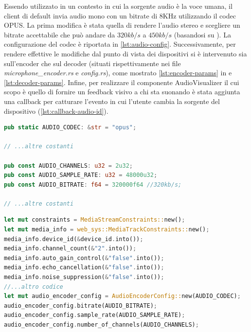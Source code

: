\documentclass{article}
\begin{document}
Essendo utilizzato in un contesto in cui la sorgente audio è la voce umana, il 
client di default invia audio mono con un bitrate di 8KHz utilizzando il codec OPUS. La 
prima modifica è stata quella di rendere l'audio stereo e scegliere un bitrate accettabile
che può andare da $320 kb/s$ a $450 kb/s$ (basandosi su \cite{rfc6716}). La configurazione
del codec è riportata in \cref{lst:audio-config}. Successivamente, per rendere effettive le modifiche dal punto 
di vista dei dispositivi si è intervenuto sia sull'encoder che sul decoder (situati 
rispettivamente nei file \textit{microphone\_encoder.rs} e \textit{config.rs}), 
come mostrato \cref{lst:encoder-params} in e \cref{lst:decoder-params}. Infine, per realizzare 
il componente AudioVisualizer il cui scopo è quello di fornire un feedback visivo a chi 
sta suonando è stata aggiunta una callback per catturare l'evento in cui l'utente cambia 
la sorgente del dispositivo (\cref{lst:callback-audio-id}).

\begin{lstlisting}[language=Rust, style=boxed, label={lst:audio-config}, captionpos=b,caption={Configurazione utilizzata per trasmettere l'audio}]
pub static AUDIO_CODEC: &str = "opus";

// ...altre costanti

pub const AUDIO_CHANNELS: u32 = 2u32;
pub const AUDIO_SAMPLE_RATE: u32 = 48000u32;
pub const AUDIO_BITRATE: f64 = 320000f64 //320kb/s;

// ...altre costanti
\end{lstlisting}
\begin{lstlisting}[language=Rust, style=boxed, label={lst:encoder-params}, captionpos=b,caption={Configurazione audio stereo per l'encoder OPUS}]
let mut constraints = MediaStreamConstraints::new();
let mut media_info = web_sys::MediaTrackConstraints::new();
media_info.device_id(&device_id.into());
media_info.channel_count(&"2".into());
media_info.auto_gain_control(&"false".into());
media_info.echo_cancellation(&"false".into());
media_info.noise_suppression(&"false".into());
//...altro codice
let mut audio_encoder_config = AudioEncoderConfig::new(AUDIO_CODEC);
audio_encoder_config.bitrate(AUDIO_BITRATE);
audio_encoder_config.sample_rate(AUDIO_SAMPLE_RATE);
audio_encoder_config.number_of_channels(AUDIO_CHANNELS);

\end{lstlisting}
\end{document}
